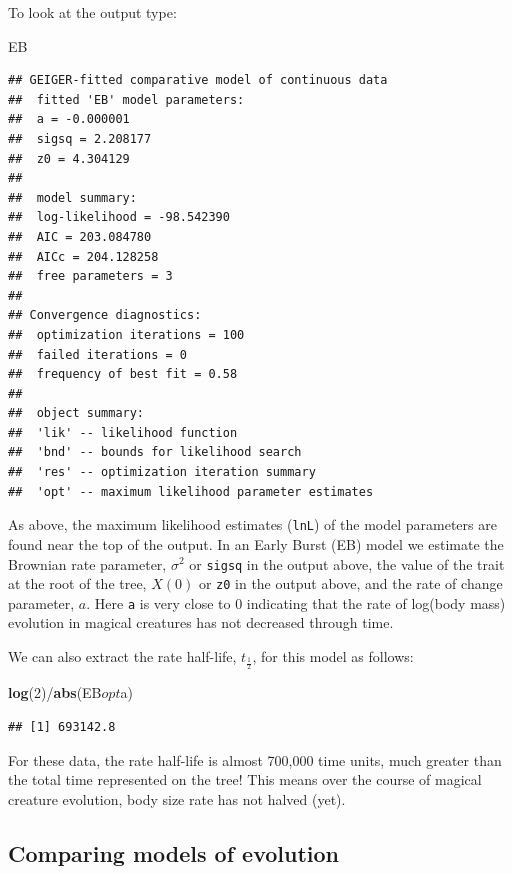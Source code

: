 \documentclass[]{book}
\newenvironment{Shaded}{\begin{snugshade}}{\end{snugshade}}
\newcommand{\KeywordTok}[1]{\textcolor[rgb]{0.13,0.29,0.53}{\textbf{{#1}}}}
\newcommand{\DecValTok}[1]{\textcolor[rgb]{0.00,0.00,0.81}{{#1}}}
\newcommand{\NormalTok}[1]{{#1}}
\begin{document}
To look at the output type:

\begin{Shaded}
\begin{Highlighting}[]
\NormalTok{EB}
\end{Highlighting}
\end{Shaded}

\begin{verbatim}
## GEIGER-fitted comparative model of continuous data
##  fitted 'EB' model parameters:
##  a = -0.000001
##  sigsq = 2.208177
##  z0 = 4.304129
## 
##  model summary:
##  log-likelihood = -98.542390
##  AIC = 203.084780
##  AICc = 204.128258
##  free parameters = 3
## 
## Convergence diagnostics:
##  optimization iterations = 100
##  failed iterations = 0
##  frequency of best fit = 0.58
## 
##  object summary:
##  'lik' -- likelihood function
##  'bnd' -- bounds for likelihood search
##  'res' -- optimization iteration summary
##  'opt' -- maximum likelihood parameter estimates
\end{verbatim}

As above, the maximum likelihood estimates (\texttt{lnL}) of the model
parameters are found near the top of the output. In an Early Burst (EB)
model we estimate the Brownian rate parameter, \(\sigma^2\) or
\texttt{sigsq} in the output above, the value of the trait at the root
of the tree, \(X(0)\) or \texttt{z0} in the output above, and the rate
of change parameter, \(a\). Here \texttt{a} is very close to 0
indicating that the rate of log(body mass) evolution in magical
creatures has not decreased through time.

We can also extract the rate half-life, \(t_{\frac{1}{2}}\), for this
model as follows:

\begin{Shaded}
\begin{Highlighting}[]
\KeywordTok{log}\NormalTok{(}\DecValTok{2}\NormalTok{)/}\KeywordTok{abs}\NormalTok{(EB$opt$a)}
\end{Highlighting}
\end{Shaded}

\begin{verbatim}
## [1] 693142.8
\end{verbatim}

For these data, the rate half-life is almost 700,000 time units, much
greater than the total time represented on the tree! This means over the
course of magical creature evolution, body size rate has not halved
(yet).

\subsection{Comparing models of
evolution}\label{comparing-models-of-evolution}
\end{document}
